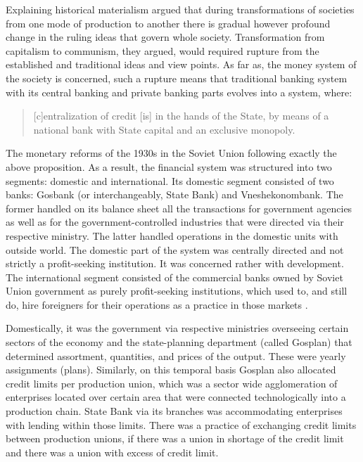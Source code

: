 Explaining historical materialism \citeauthor{marx1848} argued that during transformations of societies from one mode of production to another there is gradual however profound change in the ruling ideas that govern whole society. Transformation from capitalism to communism, they argued, would required rupture from the established and traditional ideas and view points. As far as, the money system of the society is concerned, such a rupture means that traditional banking system with its central banking and private banking parts evolves into a system, where:

\begin{quote}
[c]entralization of credit [is] in the hands of the State, by means of a national bank with State capital and an exclusive monopoly. \citep[p.~26]{marx1848}
\end{quote}

The monetary reforms of the 1930s in the Soviet Union following exactly the above proposition. As a result, the financial system was structured into two segments: domestic and
international. Its domestic segment consisted of two banks: Gosbank (or
interchangeably, State Bank) and Vneshekonombank. The former handled on
its balance sheet all the transactions for government agencies as well
as for the government-controlled industries that were directed via their
respective ministry. The latter handled operations in the domestic units
with outside world. The domestic part of the system was centrally
directed and not strictly a profit-seeking institution. It was concerned
rather with development. The international segment consisted of the
commercial banks owned by Soviet Union government as purely
profit-seeking institutions, which used to, and still do, hire
foreigners for their operations as a practice in those markets \citep{krotov2007,krotov2011}.

Domestically, it was the government via respective ministries overseeing
certain sectors of the economy and the state-planning department (called
Gosplan) that determined assortment, quantities, and prices of the
output. These were yearly assignments (plans). Similarly, on this
temporal basis Gosplan also allocated credit limits per production
union, which was a sector wide agglomeration of enterprises located over
certain area that were connected technologically into a production
chain. State Bank via its branches was accommodating enterprises with
lending within those limits. There was a practice of exchanging credit
limits between production unions, if there was a union in shortage of
the credit limit and there was a union with excess of credit limit.

